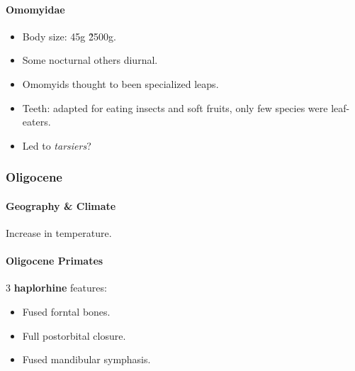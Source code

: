 \documentclass{article}
\begin{document}
	\paragraph{Omomyidae}
	\begin{itemize}
		\item Body size: 45g \~ 2500g.
		\item Some nocturnal others diurnal.
		\item Omomyids thought to been specialized leaps.
		\item Teeth: adapted for eating insects and soft fruits, only few species were leaf-eaters.
		\item Led to \emph{tarsiers}?
	\end{itemize}

\subsubsection{Oligocene}
	\paragraph{Geography \& Climate} Increase in temperature.
	\paragraph{Oligocene Primates} 3 \textbf{haplorhine} features:
	\begin{itemize}
		\item Fused forntal bones.
		\item Full postorbital closure.
		\item Fused mandibular symphasis.
	\end{itemize}
\end{document}
